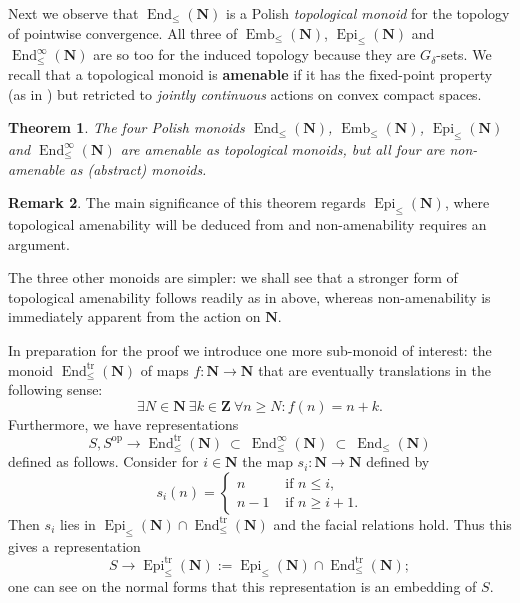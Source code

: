 \documentclass[12pt, pdflatex]{amsart}
\newtheorem{theorem}{Theorem}
\theoremstyle{definition}
\newtheorem{remark}[theorem]{Remark}
\numberwithin{equation}{section}
\numberwithin{theorem}{section}
\newcommand{\NN}{\mathbf{N}}
\newcommand{\ZZ}{\mathbf{Z}}
\DeclareMathOperator{\End}{End}
\DeclareMathOperator{\Emb}{Emb}
\DeclareMathOperator{\Epi}{Epi}
\begin{document}
\medskip

Next we observe that $\End_\leq(\NN)$ is a Polish \emph{topological monoid} for the topology of pointwise convergence. All three of $\Emb_\leq(\NN)$, $\Epi_\leq(\NN)$ and $\End_\leq^\infty(\NN)$ are so too for the induced topology because they are $G_\delta$-sets. We recall that a topological monoid is \textbf{amenable} if it has the fixed-point property (as in ) but retricted to \emph{jointly continuous} actions on convex compact spaces.

\begin{theorem}\label{thm:related}
The four Polish monoids $\End_\leq(\NN)$, $\Emb_\leq(\NN)$, $\Epi_\leq(\NN)$ and $\End_\leq^\infty(\NN)$ are amenable as topological monoids, but all four are non-amenable as (abstract) monoids.
\end{theorem}

\begin{remark}
The main significance of this theorem regards $\Epi_\leq(\NN)$, where topological amenability will be deduced from  and non-amenability requires an argument.

The three other monoids are simpler: we shall see that a stronger form of topological amenability follows readily as in  above, whereas non-amenability is immediately apparent from the action on $\NN$.
\end{remark}

In preparation for the proof we introduce one more sub-monoid of interest: the monoid $\End_\leq^\mathrm{tr}(\NN)$ of maps $f\colon\NN\to\NN$ that are eventually translations in the following sense:
\begin{equation}\label{eq:trans}
\exists N \in \NN \ \exists k\in \ZZ \ \forall n\geq N: f(n) = n+k.
\end{equation}
Furthermore, we have representations
\begin{equation*}
S, S^\mathrm{op} \longrightarrow \End_\leq^\mathrm{tr}(\NN) \ \subset \ \End_\leq^\infty(\NN) \ \subset \ \End_\leq(\NN)
\end{equation*}
defined as follows. Consider for $i\in \NN$ the map $s_i\colon \NN\to \NN$ defined by
\begin{equation*}
 s_i(n) = 
    \begin{cases}
        n &\text{ if } n \leq i, \\
        n-1 &\text{ if } n \geq i+1.
    \end{cases}
\end{equation*}
Then $s_i$ lies in $\Epi_\leq(\NN) \cap \End_\leq^\mathrm{tr}(\NN)$ and the facial relations hold. Thus this gives a representation
\begin{equation*}
S \longrightarrow \Epi_\leq^\mathrm{tr}(\NN) := \Epi_\leq(\NN) \cap \End_\leq^\mathrm{tr}(\NN);
\end{equation*}
one can see on the normal forms that this representation is an embedding of $S$.
\end{document}

